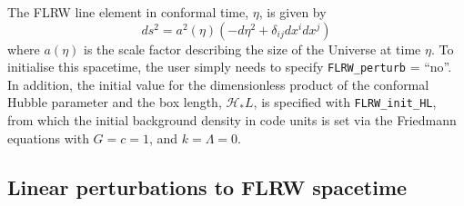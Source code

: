 The FLRW line element in conformal time, $\eta$, is given by
\begin{equation}
	ds^2 = a^2(\eta) \left( - d\eta^2 + \delta_{ij}dx^i dx^j \right)
\end{equation}
where $a(\eta)$ is the scale factor describing the size of the Universe at time $\eta$. To initialise this spacetime, the user simply needs to specify \texttt{FLRW\_perturb} = ``no''. In addition, the initial value for the dimensionless product of the conformal Hubble parameter and the box length, $\mathcal{H}_* L$, is specified with \texttt{FLRW\_init\_HL}, from which the initial background density in code units is set via the Friedmann equations with $G=c=1$, and $k=\Lambda=0$. 

\subsection{Linear perturbations to FLRW spacetime}

